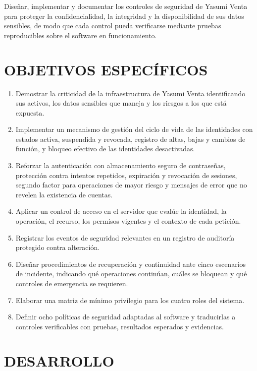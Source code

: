 \documentclass[12pt,letterpaper]{article}
\begin{document}
Diseñar, implementar y documentar los controles de seguridad de Yasumi Venta para proteger la confidencialidad, la integridad y la disponibilidad de sus datos sensibles, de modo que cada control pueda verificarse mediante pruebas reproducibles sobre el software en funcionamiento.

\section{OBJETIVOS ESPECÍFICOS}

\begin{enumerate}
  \item Demostrar la criticidad de la infraestructura de Yasumi Venta identificando sus activos, los datos sensibles que maneja y los riesgos a los que está expuesta.
  \item Implementar un mecanismo de gestión del ciclo de vida de las identidades con estados activa, suspendida y revocada, registro de altas, bajas y cambios de función, y bloqueo efectivo de las identidades desactivadas.
  \item Reforzar la autenticación con almacenamiento seguro de contraseñas, protección contra intentos repetidos, expiración y revocación de sesiones, segundo factor para operaciones de mayor riesgo y mensajes de error que no revelen la existencia de cuentas.
  \item Aplicar un control de acceso en el servidor que evalúe la identidad, la operación, el recurso, los permisos vigentes y el contexto de cada petición.
  \item Registrar los eventos de seguridad relevantes en un registro de auditoría protegido contra alteración.
  \item Diseñar procedimientos de recuperación y continuidad ante cinco escenarios de incidente, indicando qué operaciones continúan, cuáles se bloquean y qué controles de emergencia se requieren.
  \item Elaborar una matriz de mínimo privilegio para los cuatro roles del sistema.
  \item Definir ocho políticas de seguridad adaptadas al software y traducirlas a controles verificables con pruebas, resultados esperados y evidencias.
\end{enumerate}

\section{DESARROLLO}
\end{document}
